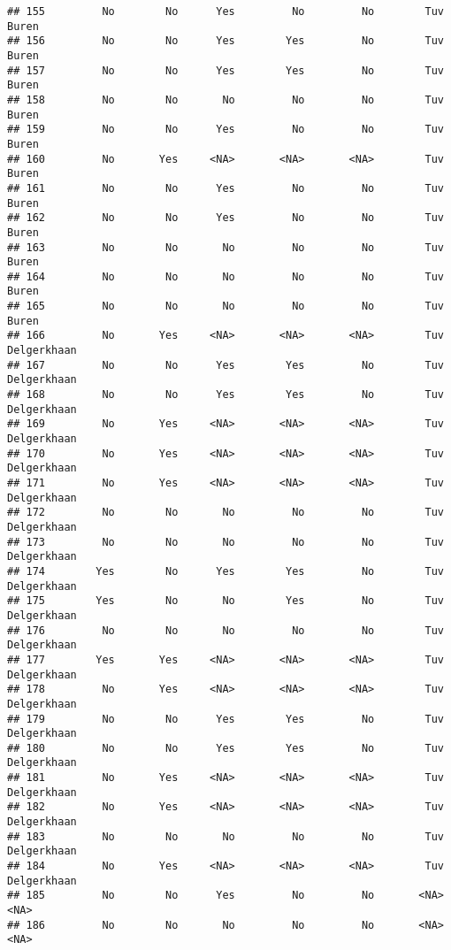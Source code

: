 \documentclass[
]{article}
\begin{document}
\begin{verbatim}
## 155         No        No      Yes         No         No        Tuv        Buren
## 156         No        No      Yes        Yes         No        Tuv        Buren
## 157         No        No      Yes        Yes         No        Tuv        Buren
## 158         No        No       No         No         No        Tuv        Buren
## 159         No        No      Yes         No         No        Tuv        Buren
## 160         No       Yes     <NA>       <NA>       <NA>        Tuv        Buren
## 161         No        No      Yes         No         No        Tuv        Buren
## 162         No        No      Yes         No         No        Tuv        Buren
## 163         No        No       No         No         No        Tuv        Buren
## 164         No        No       No         No         No        Tuv        Buren
## 165         No        No       No         No         No        Tuv        Buren
## 166         No       Yes     <NA>       <NA>       <NA>        Tuv  Delgerkhaan
## 167         No        No      Yes        Yes         No        Tuv  Delgerkhaan
## 168         No        No      Yes        Yes         No        Tuv  Delgerkhaan
## 169         No       Yes     <NA>       <NA>       <NA>        Tuv  Delgerkhaan
## 170         No       Yes     <NA>       <NA>       <NA>        Tuv  Delgerkhaan
## 171         No       Yes     <NA>       <NA>       <NA>        Tuv  Delgerkhaan
## 172         No        No       No         No         No        Tuv  Delgerkhaan
## 173         No        No       No         No         No        Tuv  Delgerkhaan
## 174        Yes        No      Yes        Yes         No        Tuv  Delgerkhaan
## 175        Yes        No       No        Yes         No        Tuv  Delgerkhaan
## 176         No        No       No         No         No        Tuv  Delgerkhaan
## 177        Yes       Yes     <NA>       <NA>       <NA>        Tuv  Delgerkhaan
## 178         No       Yes     <NA>       <NA>       <NA>        Tuv  Delgerkhaan
## 179         No        No      Yes        Yes         No        Tuv  Delgerkhaan
## 180         No        No      Yes        Yes         No        Tuv  Delgerkhaan
## 181         No       Yes     <NA>       <NA>       <NA>        Tuv  Delgerkhaan
## 182         No       Yes     <NA>       <NA>       <NA>        Tuv  Delgerkhaan
## 183         No        No       No         No         No        Tuv  Delgerkhaan
## 184         No       Yes     <NA>       <NA>       <NA>        Tuv  Delgerkhaan
## 185         No        No      Yes         No         No       <NA>         <NA>
## 186         No        No       No         No         No       <NA>         <NA>

\end{verbatim}
\end{document}
